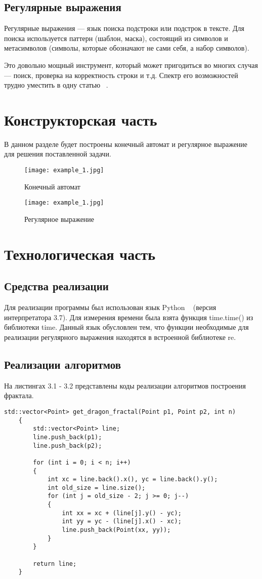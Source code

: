 \documentclass[12pt, a4paper]{report}
\begin{document}
	\section{Регулярные выражения}
	Регулярные выражения — язык поиска подстроки или подстрок в тексте. Для поиска
	используется паттерн (шаблон, маска), состоящий из символов и метасимволов (символы,
	которые обозначают не сами себя, а набор символов).
	
	Это довольно мощный инструмент, который может пригодиться во многих случая —
	поиск, проверка на корректность строки и т.д. Спектр его возможностей трудно уместить
	в одну статью ~\cite{exp}.
	
	\chapter{Конструкторская часть}
	В данном разделе будет построены конечный автомат и регулярное выражение для решения поставленной задачи.

	\begin{figure}[ht!]
		\centering
		\texttt{[image: example\_1.jpg]}
		\caption{Конечный автомат}
		\label{ris:ka}
	\end{figure}

	\begin{figure}[ht!]
		\centering
		\texttt{[image: example\_1.jpg]}
		\caption{Регулярное выражение}
		\label{risLregexp}
	\end{figure}

	\chapter{Технологическая часть}
	\section{Средства реализации}
	Для реализации программы был использован язык Python ~\cite{Python} (версия интерпретатора 3.7). Для измерения времени была взята функция time.time() из
	библиотеки time. Данный язык обусловлен тем, что функции необходимые для реализации регулярного
	выражения находятся в встроенной библиотеке re.
	
	\section{Реализации алгоритмов}
	На листингах 3.1 - 3.2 представлены коды реализации алгоритмов построения фрактала.
	\begin{lstlisting}[label=some-code,caption=Итерационная реализация]
	std::vector<Point> get_dragon_fractal(Point p1, Point p2, int n)
	{
		std::vector<Point> line;
		line.push_back(p1);
		line.push_back(p2);
	
		for (int i = 0; i < n; i++)
		{
			int xc = line.back().x(), yc = line.back().y();
			int old_size = line.size();
			for (int j = old_size - 2; j >= 0; j--)
			{
				int xx = xc + (line[j].y() - yc);
				int yy = yc - (line[j].x() - xc);
				line.push_back(Point(xx, yy));
			}
		}
	
		return line;
	}
	\end{lstlisting}
\end{document}
